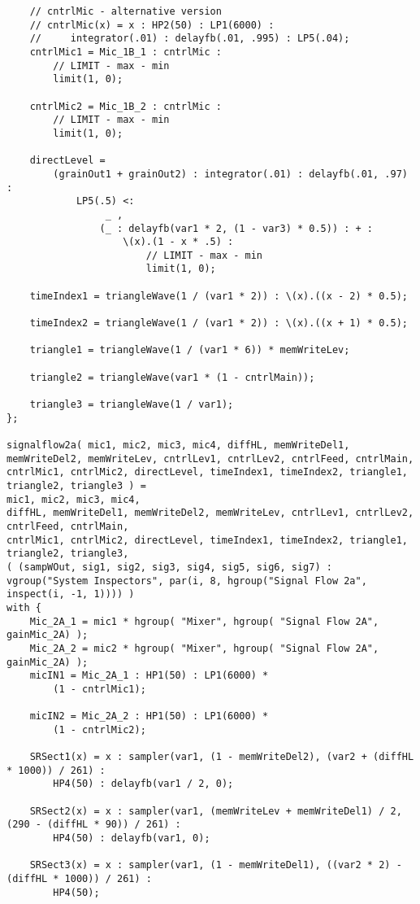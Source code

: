 \begin{lstlisting}
    // cntrlMic - alternative version
    // cntrlMic(x) = x : HP2(50) : LP1(6000) :
    //     integrator(.01) : delayfb(.01, .995) : LP5(.04);
    cntrlMic1 = Mic_1B_1 : cntrlMic : 
        // LIMIT - max - min
        limit(1, 0);

    cntrlMic2 = Mic_1B_2 : cntrlMic : 
        // LIMIT - max - min
        limit(1, 0);

    directLevel =
        (grainOut1 + grainOut2) : integrator(.01) : delayfb(.01, .97) : 
            LP5(.5) <: 
                 _ , 
                (_ : delayfb(var1 * 2, (1 - var3) * 0.5)) : + : 
                    \(x).(1 - x * .5) : 
                        // LIMIT - max - min
                        limit(1, 0);

    timeIndex1 = triangleWave(1 / (var1 * 2)) : \(x).((x - 2) * 0.5);

    timeIndex2 = triangleWave(1 / (var1 * 2)) : \(x).((x + 1) * 0.5);

    triangle1 = triangleWave(1 / (var1 * 6)) * memWriteLev;

    triangle2 = triangleWave(var1 * (1 - cntrlMain));

    triangle3 = triangleWave(1 / var1);
};

signalflow2a( mic1, mic2, mic3, mic4, diffHL, memWriteDel1, memWriteDel2, memWriteLev, cntrlLev1, cntrlLev2, cntrlFeed, cntrlMain, cntrlMic1, cntrlMic2, directLevel, timeIndex1, timeIndex2, triangle1, triangle2, triangle3 ) = 
mic1, mic2, mic3, mic4, 
diffHL, memWriteDel1, memWriteDel2, memWriteLev, cntrlLev1, cntrlLev2, cntrlFeed, cntrlMain, 
cntrlMic1, cntrlMic2, directLevel, timeIndex1, timeIndex2, triangle1, triangle2, triangle3, 
( (sampWOut, sig1, sig2, sig3, sig4, sig5, sig6, sig7) : vgroup("System Inspectors", par(i, 8, hgroup("Signal Flow 2a", inspect(i, -1, 1)))) )
with {
    Mic_2A_1 = mic1 * hgroup( "Mixer", hgroup( "Signal Flow 2A", gainMic_2A) );
    Mic_2A_2 = mic2 * hgroup( "Mixer", hgroup( "Signal Flow 2A", gainMic_2A) );
    micIN1 = Mic_2A_1 : HP1(50) : LP1(6000) * 
        (1 - cntrlMic1);

    micIN2 = Mic_2A_2 : HP1(50) : LP1(6000) * 
        (1 - cntrlMic2);

    SRSect1(x) = x : sampler(var1, (1 - memWriteDel2), (var2 + (diffHL * 1000)) / 261) : 
        HP4(50) : delayfb(var1 / 2, 0);

    SRSect2(x) = x : sampler(var1, (memWriteLev + memWriteDel1) / 2, (290 - (diffHL * 90)) / 261) : 
        HP4(50) : delayfb(var1, 0);

    SRSect3(x) = x : sampler(var1, (1 - memWriteDel1), ((var2 * 2) - (diffHL * 1000)) / 261) : 
        HP4(50);


\end{lstlisting}
